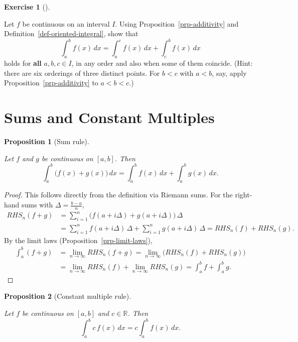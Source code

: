 \documentclass[
  letterpaper,
  DIV=11,
  numbers=noendperiod]{scrreprt}
\theoremstyle{plain}
\theoremstyle{plain}
\newtheorem{proposition}{Proposition}[chapter]
\theoremstyle{definition}
\theoremstyle{definition}
\newtheorem{exercise}{Exercise}[chapter]
\theoremstyle{definition}
\theoremstyle{plain}
\theoremstyle{plain}
\theoremstyle{remark}
\begin{document}
\begin{exercise}[]\protect\hypertarget{exr-additivity-any-order}{}\label{exr-additivity-any-order}

Let \(f\) be continuous on an interval \(I\). Using
Proposition~\ref{prp-additivity} and
Definition~\ref{def-oriented-integral}, show that \[
\int_a^b f(x)\,dx = \int_a^c f(x)\,dx + \int_c^b f(x)\,dx
\] holds for \textbf{all} \(a,b,c\in I\), in any order and also when
some of them coincide. (Hint: there are six orderings of three distinct
points. For \(b<c\) with \(a<b\), say, apply
Proposition~\ref{prp-additivity} to \(a<b<c\).)

\end{exercise}

\section{Sums and Constant Multiples}\label{sums-and-constant-multiples}

\begin{proposition}[Sum
rule]\protect\hypertarget{prp-sum-rule}{}\label{prp-sum-rule}

Let \(f\) and \(g\) be continuous on \([a,b]\). Then \[
\int_a^b \big(f(x)+g(x)\big)\,dx = \int_a^b f(x)\,dx + \int_a^b g(x)\,dx .
\]

\end{proposition}

\begin{proof}
This follows directly from the definition via Riemann sums. For the
right-hand sums with \(\Delta = \frac{b-a}{n}\), \[
\begin{aligned}
RHS_n(f+g) &= \sum_{i=1}^n \big(f(a+i\Delta) + g(a+i\Delta)\big)\,\Delta \\
&= \sum_{i=1}^n f(a+i\Delta)\,\Delta + \sum_{i=1}^n g(a+i\Delta)\,\Delta
= RHS_n(f) + RHS_n(g).
\end{aligned}
\] By the limit laws (Proposition~\ref{prp-limit-laws}), \begin{align}
\int_a^b (f+g) & = \lim_{n\to\infty} RHS_n(f+g) = \lim_{n\to\infty}\big(RHS_n(f)+RHS_n(g)\big) \\
 & = \lim_{n\to\infty} RHS_n(f) + \lim_{n\to\infty} RHS_n(g) = \int_a^b f + \int_a^b g .
\end{align}
\end{proof}

\begin{proposition}[Constant multiple
rule]\protect\hypertarget{prp-constant-multiple}{}\label{prp-constant-multiple}

Let \(f\) be continuous on \([a,b]\) and \(c\in\mathbb{R}\). Then \[
\int_a^b c\,f(x)\,dx = c\int_a^b f(x)\,dx .
\]

\end{proposition}
\end{document}
